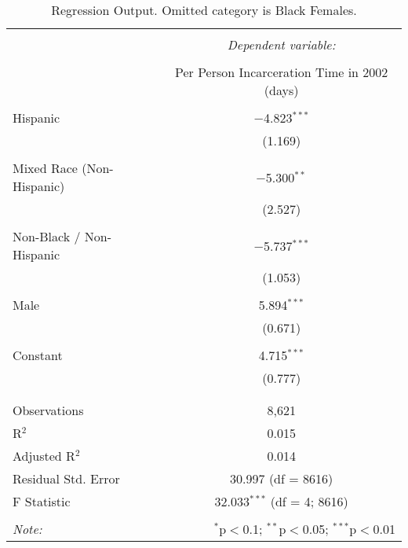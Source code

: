 
\begin{table}[!htbp] \centering 
  \caption{Regression Output. Omitted category is Black Females.} 
  \label{tab:regression} 
\begin{tabular}{@{\extracolsep{5pt}}lc} 
\\[-1.8ex]\hline 
\hline \\[-1.8ex] 
 & \multicolumn{1}{c}{\textit{Dependent variable:}} \\ 
\cline{2-2} 
\\[-1.8ex] & Per Person Incarceration Time in 2002 (days) \\ 
\hline \\[-1.8ex] 
 Hispanic & $-$4.823$^{***}$ \\ 
  & (1.169) \\ 
  & \\ 
 Mixed Race (Non-Hispanic) & $-$5.300$^{**}$ \\ 
  & (2.527) \\ 
  & \\ 
 Non-Black / Non-Hispanic & $-$5.737$^{***}$ \\ 
  & (1.053) \\ 
  & \\ 
 Male & 5.894$^{***}$ \\ 
  & (0.671) \\ 
  & \\ 
 Constant & 4.715$^{***}$ \\ 
  & (0.777) \\ 
  & \\ 
\hline \\[-1.8ex] 
Observations & 8,621 \\ 
R$^{2}$ & 0.015 \\ 
Adjusted R$^{2}$ & 0.014 \\ 
Residual Std. Error & 30.997 (df = 8616) \\ 
F Statistic & 32.033$^{***}$ (df = 4; 8616) \\ 
\hline 
\hline \\[-1.8ex] 
\textit{Note:}  & \multicolumn{1}{r}{$^{*}$p$<$0.1; $^{**}$p$<$0.05; $^{***}$p$<$0.01} \\ 
\end{tabular} 
\end{table} 
